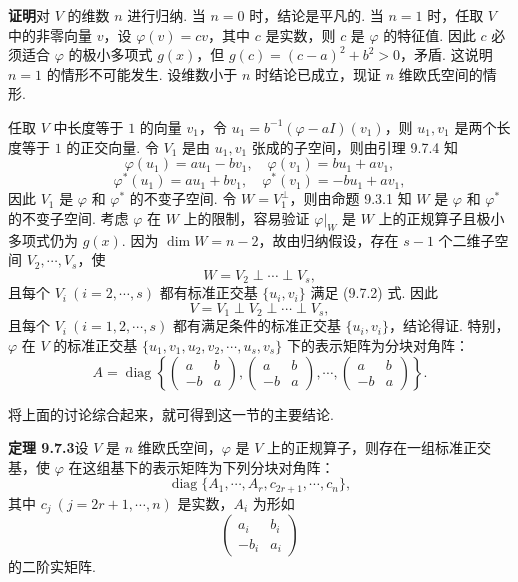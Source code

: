 \documentclass[UTF8, 12pt, fontset=fandol, oneside]{ctexart}
\begin{document}
\noindent\textbf{证明}\quad 对 $V$ 的维数 $n$ 进行归纳. 当 $n=0$ 时，结论是平凡的. 当 $n=1$ 时，任取 $V$ 中的非零向量 $v$，设 $\varphi(v)=cv$，其中 $c$ 是实数，则 $c$ 是 $\varphi$ 的特征值. 因此 $c$ 必须适合 $\varphi$ 的极小多项式 $g(x)$，但 $g(c)=(c-a)^2+b^2>0$，矛盾. 这说明 $n=1$ 的情形不可能发生. 设维数小于 $n$ 时结论已成立，现证 $n$ 维欧氏空间的情形.

任取 $V$ 中长度等于 $1$ 的向量 $v_1$，令 $u_1=b^{-1}(\varphi-aI)(v_1)$，则 $u_1,v_1$ 是两个长度等于 $1$ 的正交向量. 令 $V_1$ 是由 $u_1,v_1$ 张成的子空间，则由引理 9.7.4 知
\[
  \varphi(u_1)=au_1-bv_1,\quad \varphi(v_1)=bu_1+av_1,
\]
\[
  \varphi^*(u_1)=au_1+bv_1,\quad \varphi^*(v_1)=-bu_1+av_1,
\]
因此 $V_1$ 是 $\varphi$ 和 $\varphi^*$ 的不变子空间. 令 $W=V_1^\perp$，则由命题 9.3.1 知 $W$ 是 $\varphi$ 和 $\varphi^*$ 的不变子空间. 考虑 $\varphi$ 在 $W$ 上的限制，容易验证 $\varphi|_W$ 是 $W$ 上的正规算子且极小多项式仍为 $g(x)$. 因为 $\dim W=n-2$，故由归纳假设，存在 $s-1$ 个二维子空间 $V_2,\cdots,V_s$，使
\[
  W=V_2\perp\cdots\perp V_s,
\]
且每个 $V_i\ (i=2,\cdots,s)$ 都有标准正交基 $\{u_i,v_i\}$ 满足 (9.7.2) 式. 因此
\[
  V=V_1\perp V_2\perp\cdots\perp V_s,
\]
且每个 $V_i\ (i=1,2,\cdots,s)$ 都有满足条件的标准正交基 $\{u_i,v_i\}$，结论得证. 特别，$\varphi$ 在 $V$ 的标准正交基 $\{u_1,v_1,u_2,v_2,\cdots,u_s,v_s\}$ 下的表示矩阵为分块对角阵：
\[
  A=\operatorname{diag}\left\{
  \left(\begin{array}{cc}
    a & b\\
    -b & a
  \end{array}\right),
  \left(\begin{array}{cc}
    a & b\\
    -b & a
  \end{array}\right),
  \cdots,
  \left(\begin{array}{cc}
    a & b\\
    -b & a
  \end{array}\right)
  \right\}.
\]

将上面的讨论综合起来，就可得到这一节的主要结论.

\noindent\textbf{定理 9.7.3}\quad 设 $V$ 是 $n$ 维欧氏空间，$\varphi$ 是 $V$ 上的正规算子，则存在一组标准正交基，使 $\varphi$ 在这组基下的表示矩阵为下列分块对角阵：
\begin{equation}
  \operatorname{diag}\{A_1,\cdots,A_r,c_{2r+1},\cdots,c_n\},
  \tag{9.7.3}
\end{equation}
其中 $c_j\ (j=2r+1,\cdots,n)$ 是实数，$A_i$ 为形如
\[
  \left(\begin{array}{cc}
    a_i & b_i\\
    -b_i & a_i
  \end{array}\right)
\]
的二阶实矩阵.
\end{document}
